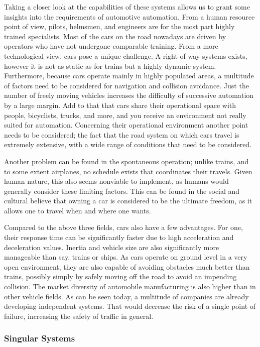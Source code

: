\documentclass{acm_proc_article-sp}
\begin{document}
Taking a closer look at the capabilities of these systems allows us to grant some insights into the requirements of automotive automation.
From a human resource point of view, pilots, helmsmen, and engineers are for the most part highly trained specialists.
Most of the cars on the road nowadays are driven by operators who have not undergone comparable training.
From a more technological view, cars pose a unique challenge.
A right-of-way systems exists, however it is not as static as for trains but a highly dynamic system.
Furthermore, because cars operate mainly in highly populated areas, a multitude of factors need to be considered for navigation and collision avoidance.
Just the number of freely moving vehicles increases the difficulty of successive automation by a large margin.
Add to that that cars share their operational space with people, bicyclists, trucks, and more, and you receive an environment not really suited for automation.
Concerning their operational environment another point needs to be considered; the fact that the road system on which cars travel is extremely extensive, with a wide range of conditions that need to be considered.

Another problem can be found in the spontaneous operation; unlike trains, and to some extent airplanes, no schedule exists that coordinates their travels.
Given human nature, this also seems nonviable to implement, as humans would generally consider these limiting factors.
This can be found in the social and cultural believe that owning a car is considered to be the ultimate freedom, as it allows one to travel when and where one wants.

Compared to the above three fields, cars also have a few advantages.
For one, their response time can be significantly faster due to high acceleration and deceleration values.
Inertia and vehicle size are also significantly more manageable than say, trains or ships.
As cars operate on ground level in a very open environment, they are also capable of avoiding obstacles much better than trains, possibly simply by safely moving off the road to avoid an impending collision.
The market diversity of automobile manufacturing is also higher than in other vehicle fields.
As can be seen today, a multitude of companies are already developing independent systems.
That would decrease the risk of a single point of failure, increasing the safety of traffic in general.

\subsubsection{Singular Systems}
\end{document}
